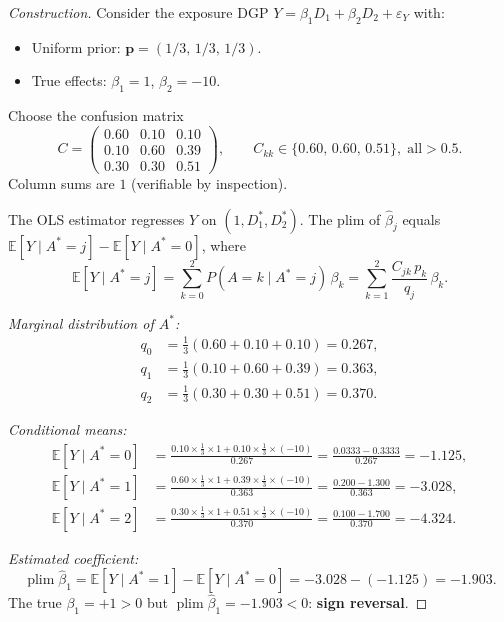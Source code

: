 \begin{proof}[Construction]
Consider the exposure DGP $Y = \beta_1 D_1 + \beta_2 D_2 + \varepsilon_Y$ with:
\begin{itemize}
  \item Uniform prior: $\mathbf{p}=(1/3,\,1/3,\,1/3)$.
  \item True effects: $\beta_1=1$,\; $\beta_2=-10$.
\end{itemize}
Choose the confusion matrix
\[
  C = \begin{pmatrix}
    0.60 & 0.10 & 0.10\\
    0.10 & 0.60 & 0.39\\
    0.30 & 0.30 & 0.51
  \end{pmatrix},\qquad
  C_{kk}\in\{0.60,\,0.60,\,0.51\},\;\text{all}>0.5.
\]
Column sums are $1$ (verifiable by inspection).

The OLS estimator regresses $Y$ on $(1,D_1^*,D_2^*)$.
The plim of $\hat\beta_j$ equals $\mathbb{E}[Y\mid A^*{=}j]-\mathbb{E}[Y\mid A^*{=}0]$, where
\[
  \mathbb{E}[Y\mid A^*{=}j] = \sum_{k=0}^{2} P(A{=}k\mid A^*{=}j)\,\beta_k
  = \sum_{k=1}^{2}\frac{C_{jk}\,p_k}{q_j}\,\beta_k.
\]

\emph{Marginal distribution of $A^*$:}
\begin{align*}
  q_0 &= \tfrac{1}{3}(0.60+0.10+0.10)=0.267,\\
  q_1 &= \tfrac{1}{3}(0.10+0.60+0.39)=0.363,\\
  q_2 &= \tfrac{1}{3}(0.30+0.30+0.51)=0.370.
\end{align*}

\emph{Conditional means:}
\begin{align*}
  \mathbb{E}[Y\mid A^*{=}0]
  &= \frac{0.10\times\tfrac{1}{3}\times 1 + 0.10\times\tfrac{1}{3}\times({-}10)}{0.267}
  = \frac{0.0333-0.3333}{0.267} = -1.125,\\[4pt]
  \mathbb{E}[Y\mid A^*{=}1]
  &= \frac{0.60\times\tfrac{1}{3}\times 1 + 0.39\times\tfrac{1}{3}\times({-}10)}{0.363}
  = \frac{0.200-1.300}{0.363} = -3.028,\\[4pt]
  \mathbb{E}[Y\mid A^*{=}2]
  &= \frac{0.30\times\tfrac{1}{3}\times 1 + 0.51\times\tfrac{1}{3}\times({-}10)}{0.370}
  = \frac{0.100-1.700}{0.370} = -4.324.
\end{align*}

\emph{Estimated coefficient:}
\[
  \operatorname{plim}\hat\beta_1 = \mathbb{E}[Y\mid A^*{=}1]-\mathbb{E}[Y\mid A^*{=}0]
  = -3.028-(-1.125) = \mathbf{-1.903}.
\]
The true $\beta_1=+1>0$ but $\operatorname{plim}\hat\beta_1=-1.903<0$: \textbf{sign reversal}.


\end{proof}

